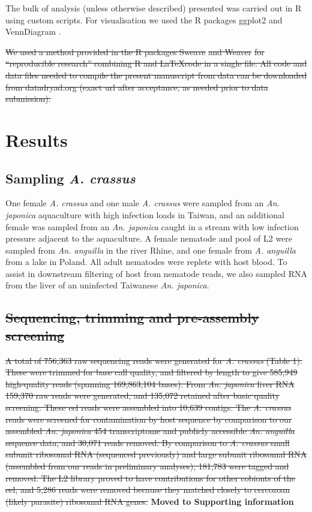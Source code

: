 \documentclass[10pt]{bmc_article}
\newenvironment{bmcformat}{\begin{raggedright}\baselineskip20pt\sloppy\setboolean{publ}{false}}{\end{raggedright}\baselineskip20pt\sloppy}
\begin{document}
\begin{bmcformat}
The bulk of analysis (unless otherwise described) presented was
carried out in R \cite{R_project} using custom scripts. For
visualisation we used the R packages ggplot2 \cite{ggplot-book} and
VennDiagram \cite{pmid21269502}. 

\sout{We used a method provided in the R packages Sweave}
\cite{lmucs-papers:Leisch:2002} \sout{and Weaver} \cite{weaver} \sout{for
``reproducible research'' combining R and \LaTeX code in a single
file. All code and data files needed to compile the present manuscript
from data can be downloaded from datadryad.org (exact url after
acceptance, as needed prior to data submission).}

\section*{Results}


\subsection*{Sampling \textit{A. crassus}}

One female \textit{A. crassus} and one male \textit{A. crassus} were
sampled from an \textit{An. japonica} aquaculture with high infection
loads in Taiwan, and an additional female was sampled from an
\textit{An. japonica} caught in a stream with low infection pressure
adjacent to the aquaculture. A female nematode and pool of L2 were
sampled from \textit{An. anguilla} in the river Rhine, and one female
from \textit{A. anguilla} from a lake in Poland. All adult nematodes
were replete with host blood. To assist in downstream filtering of
host from nematode reads, we also sampled RNA from the liver of an
uninfected Taiwanese \textit{An. japonica}.

 \subsection*{\sout{Sequencing, trimming and pre-assembly screening}}

\sout{
 A total of 756,363 raw sequencing reads were generated for
 \textit{A. crassus} (Table 1). These were trimmed for base call
 quality, and filtered by length to give 585,949 high-quality reads
 (spanning 169,863,104 bases). From \textit{An. japonica} liver RNA
 159,370 raw reads were generated, and 135,072 retained after basic
 quality screening. These eel reads were assembled into 10,639
 contigs. The \textit{A. crassus} reads were screened for
 contamination by host sequence by comparison to our assembled
 \textit{An. japonica} 454 transcriptome and publicly accessible
 \textit{An. anguilla} sequence data, and 30,071 reads removed. By
 comparison to \textit{A. crassus} small subunit ribosomal RNA
 (sequenced previously) and large subunit ribosomal RNA (assembled
 from our reads in preliminary analyses), 181,783 were tagged and
 removed. The L2 library proved to have contributions for other
 cobionts of the eel, and 5,286 reads were removed because they
 matched closely to cercozoan (likely parasite) ribosomal RNA genes.
} \textbf{Moved to Supporting information}


\end{bmcformat}
\end{document}
